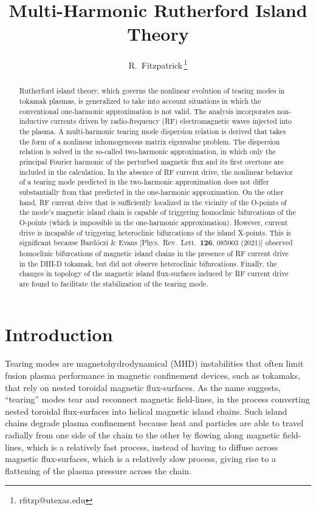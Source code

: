 \documentclass[12pt,prb,aps]{revtex4-1}
\begin{document}
\title{Multi-Harmonic Rutherford Island Theory}

\author{R.~Fitzpatrick\,\footnote{rfitzp@utexas.edu}}

\begin{abstract}
Rutherford island theory, which governs the nonlinear evolution of tearing modes in tokamak plasmas,  is generalized to take into account situations in which the conventional one-harmonic
approximation is not valid. The analysis incorporates  non-inductive currents driven by radio-frequency (RF) electromagnetic waves injected into the plasma. A
multi-harmonic tearing mode dispersion relation is derived that takes the form of a nonlinear inhomogeneous matrix
eigenvalue problem.   The  dispersion relation is solved in the so-called two-harmonic approximation,
in which  only the principal Fourier harmonic of the perturbed magnetic flux and its first overtone are included in the calculation.
In the absence of RF current drive, the nonlinear behavior of a tearing
mode predicted in the two-harmonic approximation does not differ substantially from that predicted in the
 one-harmonic approximation.  On the other hand, RF current drive that is sufficiently localized in the
vicinity of the O-points of the mode's magnetic island chain is capable of triggering  homoclinic bifurcations of the O-points (which is impossible in the one-harmonic approximation). However, current
drive is incapable of triggering heteroclinic bifurcations of the island X-points. This is significant because
 Bard\'{o}czi \& Evans [Phys.\ Rev.\ Lett.\ {\bf 126}, 085003 (2021)]  observed homoclinic bifurcations of magnetic island chains in the presence of RF
 current drive in the DIII-D tokamak, but did not observe heteroclinic bifurcations. Finally, the changes in topology of the magnetic island
 flux-surfaces induced by RF current drive are found to facilitate the stabilization of the tearing mode. 
\end{abstract}

\maketitle

\section{Introduction}
Tearing modes are magnetohydrodynamical  (MHD) instabilities that often limit fusion plasma performance in  magnetic confinement devices, such as tokamaks, that rely on nested toroidal
magnetic flux-surfaces.\cite{fkr,wesson} As the name suggests, ``tearing''
modes tear and reconnect magnetic field-lines, in the process
converting nested toroidal flux-surfaces into helical magnetic
island chains.\cite{ruth} Such island chains degrade plasma confinement because
heat and particles are able to travel radially from one side of
the chain to the other by flowing along magnetic field-lines,
which is a relatively fast process, instead of having to diffuse
across magnetic flux-surfaces, which is a relatively slow
process, giving rise to a flattening of the plasma pressure across the  chain.\cite{chang,fitz}
\end{document}
